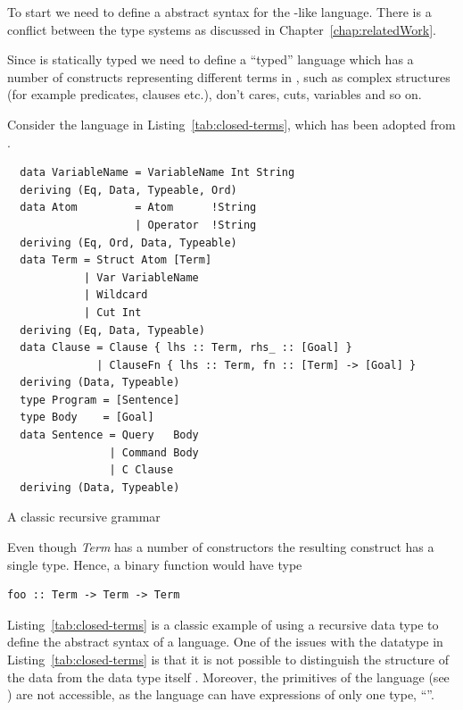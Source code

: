 \documentclass[thesis-solanki.tex]{subfiles}
\begin{document}
To start we need to define a abstract syntax for the -like language.
There is a conflict between the type systems as discussed in Chapter~\ref{chap:relatedWork}.

Since  is statically typed we need to define a ``typed'' language which
has a number of constructs representing different terms in , such as complex structures
(for example predicates, clauses etc.), don't cares, cuts, variables and so on.

Consider the language in Listing~\ref{tab:closed-terms}, which has been adopted from
\cite{prolog-lib}.

\begin{code-list}[H]
\begin{verbatim}
  data VariableName = VariableName Int String
  deriving (Eq, Data, Typeable, Ord)
  data Atom         = Atom      !String
                    | Operator  !String
  deriving (Eq, Ord, Data, Typeable)
  data Term = Struct Atom [Term]
            | Var VariableName
            | Wildcard
            | Cut Int
  deriving (Eq, Data, Typeable)
  data Clause = Clause { lhs :: Term, rhs_ :: [Goal] }
              | ClauseFn { lhs :: Term, fn :: [Term] -> [Goal] }
  deriving (Data, Typeable)
  type Program = [Sentence]
  type Body    = [Goal]
  data Sentence = Query   Body
                | Command Body
                | C Clause
  deriving (Data, Typeable)
\end{verbatim}
  \caption{A classic recursive grammar}
  \label{tab:closed-terms}
\end{code-list}

Even though \textit{Term} has a number of constructors the resulting construct has a single type.
Hence, a binary function would have type
\par
\begin{verbatim}
foo :: Term -> Term -> Term
\end{verbatim}

Listing~\ref{tab:closed-terms} is a classic example of using a recursive data type to define the
abstract syntax of a language.
One of the issues with the datatype in Listing~\ref{tab:closed-terms} is that it is not possible to distinguish the structure of the data from
the data type itself \cite{sheard2004two}.
Moreover, the primitives of the language (see \cite{website:understandingalgebrasfpcomplete})
are not accessible, as the language can have expressions of only one
type, ``''.
\end{document}

